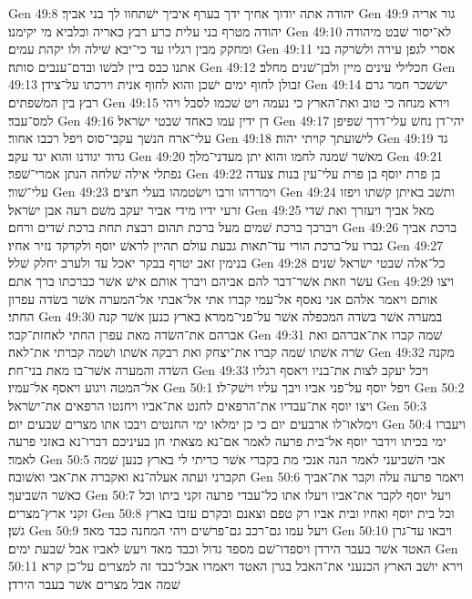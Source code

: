 Gen 49:8  יהודה אתה יודוך אחיך ידך בערף איביך ישׁתחוו לך בני אביך׃
Gen 49:9  גור אריה יהודה מטרף בני עלית כרע רבץ כאריה וכלביא מי יקימנו׃
Gen 49:10  לא־יסור שׁבט מיהודה ומחקק מבין רגליו עד כי־יבא שׁילה ולו יקהת עמים׃
Gen 49:11  אסרי לגפן עירה ולשׂרקה בני אתנו כבס ביין לבשׁו ובדם־ענבים סותה׃
Gen 49:12  חכלילי עינים מיין ולבן־שׁנים מחלב׃
Gen 49:13  זבולן לחוף ימים ישׁכן והוא לחוף אנית וירכתו על־צידן׃
Gen 49:14  ישׂשכר חמר גרם רבץ בין המשׁפתים׃
Gen 49:15  וירא מנחה כי טוב ואת־הארץ כי נעמה ויט שׁכמו לסבל ויהי למס־עבד׃
Gen 49:16  דן ידין עמו כאחד שׁבטי ישׂראל׃
Gen 49:17  יהי־דן נחשׁ עלי־דרך שׁפיפן עלי־ארח הנשׁך עקבי־סוס ויפל רכבו אחור׃
Gen 49:18  לישׁועתך קויתי יהוה׃
Gen 49:19  גד גדוד יגודנו והוא יגד עקב׃
Gen 49:20  מאשׁר שׁמנה לחמו והוא יתן מעדני־מלך׃
Gen 49:21  נפתלי אילה שׁלחה הנתן אמרי־שׁפר׃
Gen 49:22  בן פרת יוסף בן פרת עלי־עין בנות צעדה עלי־שׁור׃
Gen 49:23  וימררהו ורבו וישׂטמהו בעלי חצים׃
Gen 49:24  ותשׁב באיתן קשׁתו ויפזו זרעי ידיו מידי אביר יעקב משׁם רעה אבן ישׂראל׃
Gen 49:25  מאל אביך ויעזרך ואת שׁדי ויברכך ברכת שׁמים מעל ברכת תהום רבצת תחת ברכת שׁדים ורחם׃
Gen 49:26  ברכת אביך גברו על־ברכת הורי עד־תאות גבעת עולם תהיין לראשׁ יוסף ולקדקד נזיר אחיו׃
Gen 49:27  בנימין זאב יטרף בבקר יאכל עד ולערב יחלק שׁלל׃
Gen 49:28  כל־אלה שׁבטי ישׂראל שׁנים עשׂר וזאת אשׁר־דבר להם אביהם ויברך אותם אישׁ אשׁר כברכתו ברך אתם׃
Gen 49:29  ויצו אותם ויאמר אלהם אני נאסף אל־עמי קברו אתי אל־אבתי אל־המערה אשׁר בשׂדה עפרון החתי׃
Gen 49:30  במערה אשׁר בשׂדה המכפלה אשׁר על־פני־ממרא בארץ כנען אשׁר קנה אברהם את־השׂדה מאת עפרן החתי לאחזת־קבר׃
Gen 49:31  שׁמה קברו את־אברהם ואת שׂרה אשׁתו שׁמה קברו את־יצחק ואת רבקה אשׁתו ושׁמה קברתי את־לאה׃
Gen 49:32  מקנה השׂדה והמערה אשׁר־בו מאת בני־חת׃
Gen 49:33  ויכל יעקב לצות את־בניו ויאסף רגליו אל־המטה ויגוע ויאסף אל־עמיו׃
Gen 50:1  ויפל יוסף על־פני אביו ויבך עליו וישׁק־לו׃
Gen 50:2  ויצו יוסף את־עבדיו את־הרפאים לחנט את־אביו ויחנטו הרפאים את־ישׂראל׃
Gen 50:3  וימלאו־לו ארבעים יום כי כן ימלאו ימי החנטים ויבכו אתו מצרים שׁבעים יום׃
Gen 50:4  ויעברו ימי בכיתו וידבר יוסף אל־בית פרעה לאמר אם־נא מצאתי חן בעיניכם דברו־נא באזני פרעה לאמר׃
Gen 50:5  אבי השׁביעני לאמר הנה אנכי מת בקברי אשׁר כריתי לי בארץ כנען שׁמה תקברני ועתה אעלה־נא ואקברה את־אבי ואשׁובה׃
Gen 50:6  ויאמר פרעה עלה וקבר את־אביך כאשׁר השׁביעך׃
Gen 50:7  ויעל יוסף לקבר את־אביו ויעלו אתו כל־עבדי פרעה זקני ביתו וכל זקני ארץ־מצרים׃
Gen 50:8  וכל בית יוסף ואחיו ובית אביו רק טפם וצאנם ובקרם עזבו בארץ גשׁן׃
Gen 50:9  ויעל עמו גם־רכב גם־פרשׁים ויהי המחנה כבד מאד׃
Gen 50:10  ויבאו עד־גרן האטד אשׁר בעבר הירדן ויספדו־שׁם מספד גדול וכבד מאד ויעשׂ לאביו אבל שׁבעת ימים׃
Gen 50:11  וירא יושׁב הארץ הכנעני את־האבל בגרן האטד ויאמרו אבל־כבד זה למצרים על־כן קרא שׁמה אבל מצרים אשׁר בעבר הירדן׃
